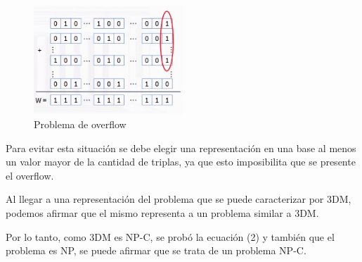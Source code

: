 \begin{figure}[H]
\centering
\includegraphics[width=0.5\textwidth]{Informe/Imagenes/Parte2/imagen2.png}
\caption{\label{fig:class01}Problema de overflow}
\end{figure}

Para evitar esta situación se debe elegir una representación en una base al menos un valor mayor de la cantidad de triplas, ya que esto imposibilita que se presente el overflow.

Al llegar a una representación del problema que se puede caracterizar por 3DM, podemos afirmar que el mismo representa a un problema similar a 3DM. 

Por lo tanto, como 3DM es NP-C, se probó la ecuación (2) y también que el problema es NP, se puede afirmar que se trata de un problema NP-C.